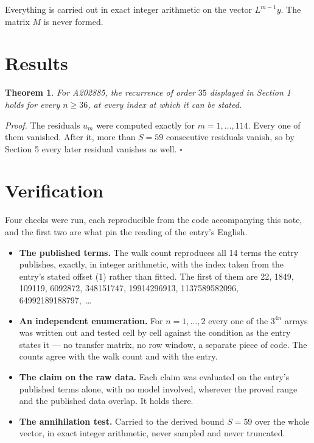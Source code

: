 \documentclass[11pt]{article}
\newtheorem{theorem}{Theorem}
\theoremstyle{definition}
\begin{document}
Everything is carried out in exact integer arithmetic on the vector $L^{m-1}y$. The matrix $M$ is never formed.

\section{Results}

\begin{theorem} For A202885, the recurrence of order $35$ displayed in Section 1 holds for every $n \ge 36$, at every index at which it can be stated.\end{theorem}

{\itshape Proof.} The residuals $u_m$ were computed exactly for $m = 1,\dots,114$. Every one of them vanished. After it, more than $S = 59$ consecutive residuals vanish, so by Section 5 every later residual vanishes as well. $\square$

\section{Verification}

Four checks were run, each reproducible from the code accompanying this note, and the first two are what pin the reading of the entry's English.

\begin{itemize}

\item {\bfseries The published terms.} The walk count reproduces all 14 terms the entry publishes, exactly, in integer arithmetic, with the index taken from the entry's stated offset (1) rather than fitted. The first of them are 22, 1849, 109119, 6092872, 348151747, 19914296913, 1137589582096, 64992189188797,~\dots

\item {\bfseries An independent enumeration.} For $n = 1,\dots,2$ every one of the $3^{4n}$ arrays was written out and tested cell by cell against the condition as the entry states it --- no transfer matrix, no row window, a separate piece of code. The counts agree with the walk count and with the entry.

\item {\bfseries The claim on the raw data.} Each claim was evaluated on the entry's published terms alone, with no model involved, wherever the proved range and the published data overlap. It holds there.

\item {\bfseries The annihilation test.} Carried to the derived bound $S = 59$ over the whole vector, in exact integer arithmetic, never sampled and never truncated.

\end{itemize}
\end{document}
